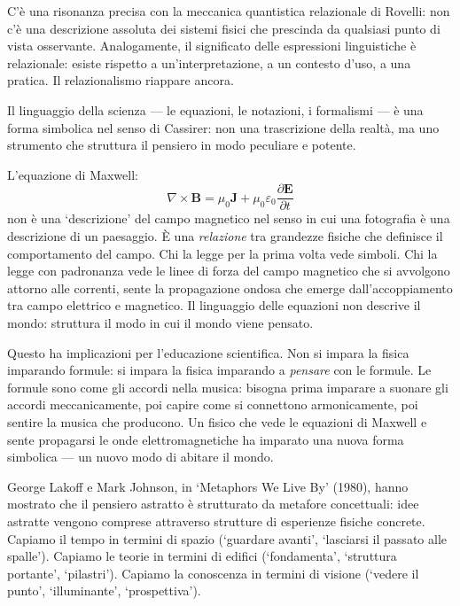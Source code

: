 \documentclass[12pt,a4paper,openany]{book}
\newcommand{\sezione}[1]{\vspace{1.2em}{\large\bfseries #1}\vspace{0.5em}\par}
\begin{document}
C'è una risonanza precisa con la meccanica quantistica relazionale di Rovelli: non c'è una descrizione assoluta dei sistemi fisici che prescinda da qualsiasi punto di vista osservante. Analogamente, il significato delle espressioni linguistiche è relazionale: esiste rispetto a un'interpretazione, a un contesto d'uso, a una pratica. Il relazionalismo riappare ancora.

\sezione{Il linguaggio scientifico come forma simbolica}

Il linguaggio della scienza --- le equazioni, le notazioni, i formalismi --- è una forma simbolica nel senso di Cassirer: non una trascrizione della realtà, ma uno strumento che struttura il pensiero in modo peculiare e potente.

L'equazione di Maxwell:
\[
\nabla \times \mathbf{B} = \mu_0\mathbf{J} + \mu_0\varepsilon_0\frac{\partial\mathbf{E}}{\partial t}
\]
non è una `descrizione' del campo magnetico nel senso in cui una fotografia è una descrizione di un paesaggio. È una \textit{relazione} tra grandezze fisiche che definisce il comportamento del campo. Chi la legge per la prima volta vede simboli. Chi la legge con padronanza vede le linee di forza del campo magnetico che si avvolgono attorno alle correnti, sente la propagazione ondosa che emerge dall'accoppiamento tra campo elettrico e magnetico. Il linguaggio delle equazioni non descrive il mondo: struttura il modo in cui il mondo viene pensato.

Questo ha implicazioni per l'educazione scientifica. Non si impara la fisica imparando formule: si impara la fisica imparando a \textit{pensare} con le formule. Le formule sono come gli accordi nella musica: bisogna prima imparare a suonare gli accordi meccanicamente, poi capire come si connettono armonicamente, poi sentire la musica che producono. Un fisico che vede le equazioni di Maxwell e sente propagarsi le onde elettromagnetiche ha imparato una nuova forma simbolica --- un nuovo modo di abitare il mondo.

\sezione{La metafora come strumento cognitivo}

George Lakoff e Mark Johnson, in `Metaphors We Live By' (1980), hanno mostrato che il pensiero astratto è strutturato da metafore concettuali: idee astratte vengono comprese attraverso strutture di esperienze fisiche concrete. Capiamo il tempo in termini di spazio (`guardare avanti', `lasciarsi il passato alle spalle'). Capiamo le teorie in termini di edifici (`fondamenta', `struttura portante', `pilastri'). Capiamo la conoscenza in termini di visione (`vedere il punto', `illuminante', `prospettiva').
\end{document}

